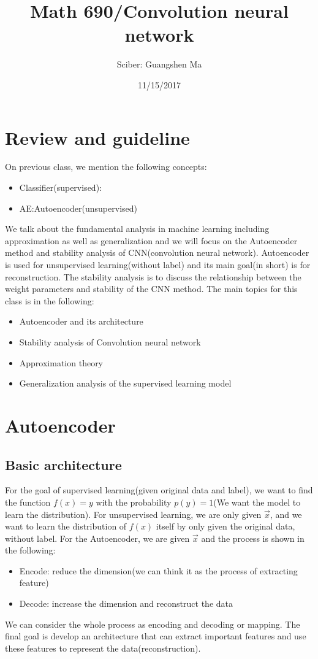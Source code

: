 \documentclass{article}
\title{Math 690/Convolution neural network}
\author{Sciber: Guangshen Ma}
\date{11/15/2017}
\begin{document}
\maketitle

\section{Review and guideline}
On previous class, we mention the following concepts:
\begin{itemize}
\item Classifier(supervised):
\item AE:Autoencoder(unsupervised)
\end{itemize}
We talk about the fundamental analysis in machine learning including approximation as well as generalization and we will focus on the Autoencoder method and stability analysis of CNN(convolution neural network). Autoencoder is used for unsupervised learning(without label) and its main goal(in short) is for reconstruction. The stability analysis is to discuss the relationship between the weight parameters and stability of the CNN method. The main topics for this class is in the following:
\begin{itemize}
\item Autoencoder and its architecture
\item Stability analysis of Convolution neural network
\item Approximation theory
\item Generalization analysis of the supervised learning model
\end{itemize}

\section{Autoencoder}
\subsection{Basic architecture}
For the goal of supervised learning(given original data and label), we want to find the function $f(x) = y$ with the probability $p(y) = 1$(We want the model to learn the distribution). For unsupervised learning, we are only given $\overrightarrow{x}$, and we want to learn the distribution of $f(x)$ itself by only given the original data, without label.
\noindent
For the Autoencoder, we are given $\overrightarrow{x}$ and the process is shown in the following:
\begin{itemize}
\item Encode: reduce the dimension(we can think it as the process of extracting feature)
\item Decode: increase the dimension and reconstruct the data
\end{itemize}
We can consider the whole process as encoding and decoding or mapping. The final goal is develop an architecture that can extract important features and use these features to represent the data(reconstruction).
\end{document}
